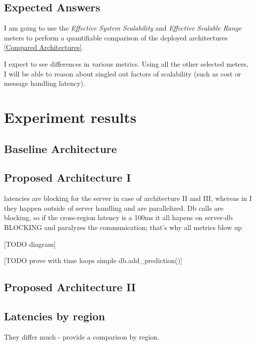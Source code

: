 \documentclass{uvamscse}
\begin{document}
\section{Expected Answers}\label{Expected Answers}
I am going to use the \textit{Effective System Scalability} and \textit{Effective Scalable Range} meters to perform a quantifiable comparison of the deployed architectures \ref{Compared Architectures}.

I expect to see differences in various metrics. Using all the other selected meters, I will be able to reason about singled out factors of scalability (such as cost or message handling latency).



\chapter{Experiment results}\label{Experiment results}

\section{Baseline Architecture}

\section{Proposed Architecture I}
latencies are blocking for the server in case of architecture II and III, whereas in I they happen outside of server handling and are parallelized. Db calls are blocking, so if the cross-region latency is a 100ms it all hapens on server-db BLOCKING and paralyzes the communication; that's why all metrics blow up

[TODO diagram]

[TODO prove with time loops simple db.add\_prediction()]

\section{Proposed Architecture II}

\section{Latencies by region}
They differ much - provide a comparison by region.
\end{document}

